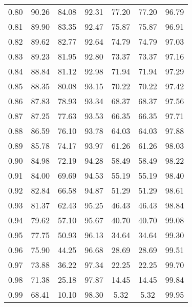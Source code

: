 \begin{tabular}{|c|c|c|c|c|c|c|}
      0.80 &     90.26 &     84.08 &      92.31 &   77.20 &      77.20 &         96.79 \\
      0.81 &     89.90 &     83.35 &      92.47 &   75.87 &      75.87 &         96.91 \\
      0.82 &     89.62 &     82.77 &      92.64 &   74.79 &      74.79 &         97.03 \\
      0.83 &     89.23 &     81.95 &      92.80 &   73.37 &      73.37 &         97.16 \\
      0.84 &     88.84 &     81.12 &      92.98 &   71.94 &      71.94 &         97.29 \\
      0.85 &     88.35 &     80.08 &      93.15 &   70.22 &      70.22 &         97.42 \\
      0.86 &     87.83 &     78.93 &      93.34 &   68.37 &      68.37 &         97.56 \\
      0.87 &     87.25 &     77.63 &      93.53 &   66.35 &      66.35 &         97.71 \\
      0.88 &     86.59 &     76.10 &      93.78 &   64.03 &      64.03 &         97.88 \\
      0.89 &     85.78 &     74.17 &      93.97 &   61.26 &      61.26 &         98.03 \\
      0.90 &     84.98 &     72.19 &      94.28 &   58.49 &      58.49 &         98.22 \\
      0.91 &     84.00 &     69.69 &      94.53 &   55.19 &      55.19 &         98.40 \\
      0.92 &     82.84 &     66.58 &      94.87 &   51.29 &      51.29 &         98.61 \\
      0.93 &     81.37 &     62.43 &      95.25 &   46.43 &      46.43 &         98.84 \\
      0.94 &     79.62 &     57.10 &      95.67 &   40.70 &      40.70 &         99.08 \\
      0.95 &     77.75 &     50.93 &      96.13 &   34.64 &      34.64 &         99.30 \\
      0.96 &     75.90 &     44.25 &      96.68 &   28.69 &      28.69 &         99.51 \\
      0.97 &     73.88 &     36.22 &      97.34 &   22.25 &      22.25 &         99.70 \\
      0.98 &     71.38 &     25.18 &      97.87 &   14.45 &      14.45 &         99.84 \\
      0.99 &     68.41 &     10.10 &      98.30 &    5.32 &       5.32 &         99.95 \\
\bottomrule
\end{tabular}
